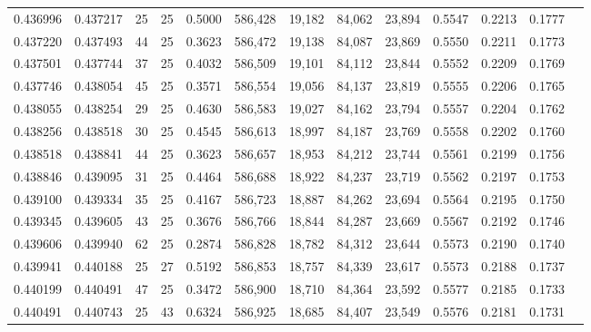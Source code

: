 \begin{tabular}{rrrrrrrrrrrrr}
0.436996 & 0.437217 &    25 &  25 &                                     0.5000 & 586,428 &  19,182 &  84,062 &  23,894 & 0.5547 & 0.2213 & 0.1777 \\
0.437220 & 0.437493 &    44 &  25 &                                     0.3623 & 586,472 &  19,138 &  84,087 &  23,869 & 0.5550 & 0.2211 & 0.1773 \\
0.437501 & 0.437744 &    37 &  25 &                                     0.4032 & 586,509 &  19,101 &  84,112 &  23,844 & 0.5552 & 0.2209 & 0.1769 \\
0.437746 & 0.438054 &    45 &  25 &                                     0.3571 & 586,554 &  19,056 &  84,137 &  23,819 & 0.5555 & 0.2206 & 0.1765 \\
0.438055 & 0.438254 &    29 &  25 &                                     0.4630 & 586,583 &  19,027 &  84,162 &  23,794 & 0.5557 & 0.2204 & 0.1762 \\
0.438256 & 0.438518 &    30 &  25 &                                     0.4545 & 586,613 &  18,997 &  84,187 &  23,769 & 0.5558 & 0.2202 & 0.1760 \\
0.438518 & 0.438841 &    44 &  25 &                                     0.3623 & 586,657 &  18,953 &  84,212 &  23,744 & 0.5561 & 0.2199 & 0.1756 \\
0.438846 & 0.439095 &    31 &  25 &                                     0.4464 & 586,688 &  18,922 &  84,237 &  23,719 & 0.5562 & 0.2197 & 0.1753 \\
0.439100 & 0.439334 &    35 &  25 &                                     0.4167 & 586,723 &  18,887 &  84,262 &  23,694 & 0.5564 & 0.2195 & 0.1750 \\
0.439345 & 0.439605 &    43 &  25 &                                     0.3676 & 586,766 &  18,844 &  84,287 &  23,669 & 0.5567 & 0.2192 & 0.1746 \\
0.439606 & 0.439940 &    62 &  25 &                                     0.2874 & 586,828 &  18,782 &  84,312 &  23,644 & 0.5573 & 0.2190 & 0.1740 \\
0.439941 & 0.440188 &    25 &  27 &                                     0.5192 & 586,853 &  18,757 &  84,339 &  23,617 & 0.5573 & 0.2188 & 0.1737 \\
0.440199 & 0.440491 &    47 &  25 &                                     0.3472 & 586,900 &  18,710 &  84,364 &  23,592 & 0.5577 & 0.2185 & 0.1733 \\
0.440491 & 0.440743 &    25 &  43 &                                     0.6324 & 586,925 &  18,685 &  84,407 &  23,549 & 0.5576 & 0.2181 & 0.1731 \\

\end{tabular}
